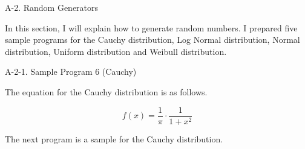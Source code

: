 \noindent
{\Large A-2. Random Generators}

\vspace*{7mm}

\noindent
In this section, I will explain how to generate random numbers. I
prepared five sample programs for the Cauchy distribution, Log Normal
distribution, Normal distribution, Uniform distribution and
Weibull distribution. 

\vspace*{20mm}

\noindent
{\Large A-2-1. Sample Program 6 (Cauchy)}

\vspace*{7mm}

\noindent
The equation for the Cauchy distribution is as follows.

\begin{equation}
f(x) = \frac{1}{\pi} \cdot \frac{1}{1+x^2}
\end{equation}

\noindent
The next program is a sample for the Cauchy distribution.

\vspace*{10mm}

